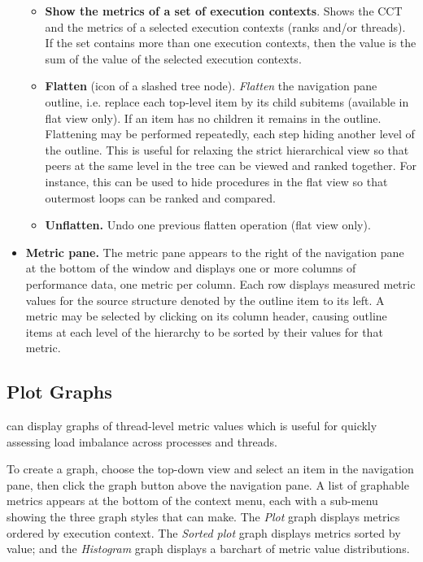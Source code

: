 \documentclass[english]{article}
\begin{document}
\begin{itemize}
\begin{itemize}
\item \textbf{Show the metrics of a set of execution contexts}.
Shows the CCT and the metrics of a selected execution contexts (ranks and/or threads).
If the set contains more than one execution contexts, then the value is the sum of the value of the selected execution contexts.

\item \textbf{Flatten} (icon of a slashed tree node).
\emph{Flatten} the navigation pane outline,
i.e. replace each top-level item by its child subitems
(available in flat view only).
If an item has no children it remains in the outline.
Flattening may be performed repeatedly, each step hiding another level of the outline.
This is useful for relaxing the strict hierarchical view
so that peers at the same level in the tree can be viewed and ranked together.
For instance, this can be used to hide procedures in the flat view
so that outermost loops can be ranked and compared.

\item \textbf{Unflatten.} Undo one previous flatten operation (flat view only).

\end{itemize}

\item  \textbf{Metric pane.}
The metric pane appears to the right of the navigation pane at the bottom of the window
and displays one or more columns of performance data, one metric per column.
Each row displays measured metric values for the source structure denoted by the outline item to its left.
A metric may be selected by clicking on its column header,
causing outline items at each level of the hierarchy to be sorted by their values for that metric.

\end{itemize}


\subsection{Plot Graphs}

 can display graphs of thread-level metric values
which is useful for quickly assessing load imbalance across processes and threads.

To create a graph,
choose the top-down view and select an item in the navigation pane,
then click the graph button above the navigation pane.
A list of graphable metrics appears at the bottom of the context menu,
each with a sub-menu showing the three graph styles that  can make.
The \emph{Plot} graph displays metrics ordered by execution context.
The \emph{Sorted plot} graph displays metrics sorted by value;
and the \emph{Histogram} graph displays a barchart of metric value distributions.
\end{document}
